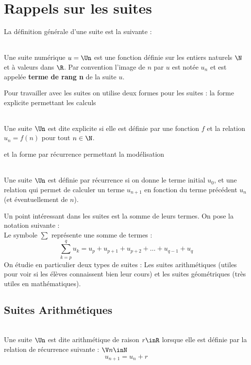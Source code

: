 \documentclass[12pt,fleqn]{report} %
\begin{document}
\section{Rappels sur les suites}

La définition générale d'une suite est la suivante :
\begin{definition}\text{ }\\
	Une suite numérique $u = \Un$ est une fonction définie sur les entiers naturels $\N$ et à valeurs dans $\R$. Par convention l'image de $n$ par $u$ est notée $u_n$ et est appelée \textbf{terme de rang n} de la suite $u$.
\end{definition}
Pour travailler avec les suites on utilise deux formes pour les suites : la forme explicite permettant les calculs
\begin{definition}\text{ }\\
	Une suite $\Un$ est dite explicite si elle est définie par une fonction $f$ et la relation $u_n = f(n)$ pour tout $n\in \N$.
\end{definition}
et la forme par récurrence permettant la modélisation
\begin{definition}\text{ }\\
	Une suite $\Un$ est définie par récurrence si on donne le terme initial $u_0$, et une relation qui permet de calculer un terme $u_{n+1}$ en fonction du terme précédent $u_n$ (et éventuellement de $n$).
\end{definition}

Un point intéressant dans les suites est la somme de leurs termes. On pose la notation suivante : \\

Le symbole $\sum$ représente une somme de termes : \[
\sum_{k = p}^{q} u_k = u_p + u_{p+1} + u_{p+2} + \dots + u_{q-1} + u_q
\]
On étudie en particulier deux types de suites : Les suites arithmétiques (utiles pour voir si les élèves connaissent bien leur cours) et les suites géométriques (très utiles en mathématiques).
\subsection{Suites Arithmétiques}
\begin{definition}\text{ }\\
	Une suite $\Un$ est dite arithmétique de raison $r \inR$ lorsque elle est définie par la relation de récurrence suivante : $\V n \inN$
	\[
	u_{n+1} = u_n + r
	\]
\end{definition}
\end{document}
